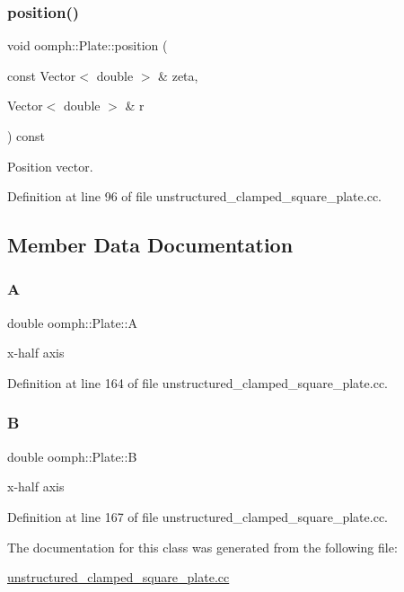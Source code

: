 \subsubsection{\texorpdfstring{position()}{position()}}
{\footnotesize\ttfamily void oomph\+::\+Plate\+::position (\begin{DoxyParamCaption}\item[{const Vector$<$ double $>$ \&}]{zeta,  }\item[{Vector$<$ double $>$ \&}]{r }\end{DoxyParamCaption}) const\hspace{0.3cm}{\ttfamily [inline]}}



Position vector. 



Definition at line 96 of file unstructured\+\_\+clamped\+\_\+square\+\_\+plate.\+cc.



\subsection{Member Data Documentation}
\mbox{\label{classoomph_1_1Plate_a482d24b39713ccb85e6e8cf7ce942c42}} 
\subsubsection{\texorpdfstring{A}{A}}
{\footnotesize\ttfamily double oomph\+::\+Plate\+::A\hspace{0.3cm}{\ttfamily [private]}}



x-\/half axis 



Definition at line 164 of file unstructured\+\_\+clamped\+\_\+square\+\_\+plate.\+cc.

\mbox{\label{classoomph_1_1Plate_a4e549830e4d7c76536cf4140220313f2}} 
\subsubsection{\texorpdfstring{B}{B}}
{\footnotesize\ttfamily double oomph\+::\+Plate\+::B\hspace{0.3cm}{\ttfamily [private]}}



x-\/half axis 



Definition at line 167 of file unstructured\+\_\+clamped\+\_\+square\+\_\+plate.\+cc.



The documentation for this class was generated from the following file\+:\begin{DoxyCompactItemize}
\item 
\hyperlink{unstructured__clamped__square__plate_8cc}{unstructured\+\_\+clamped\+\_\+square\+\_\+plate.\+cc}\end{DoxyCompactItemize}
